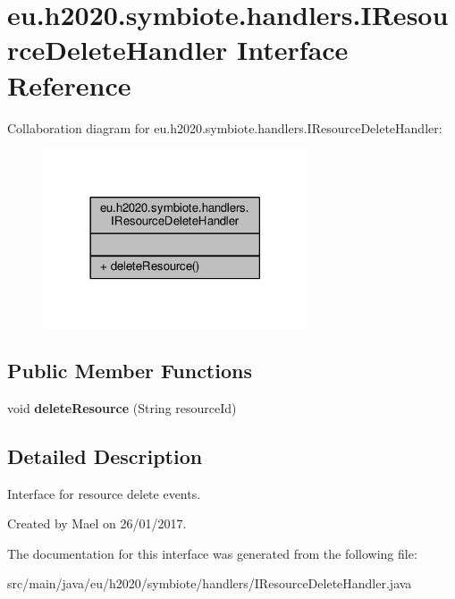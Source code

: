 \hypertarget{interfaceeu_1_1h2020_1_1symbiote_1_1handlers_1_1IResourceDeleteHandler}{}\section{eu.\+h2020.\+symbiote.\+handlers.\+I\+Resource\+Delete\+Handler Interface Reference}
\label{interfaceeu_1_1h2020_1_1symbiote_1_1handlers_1_1IResourceDeleteHandler}


Collaboration diagram for eu.\+h2020.\+symbiote.\+handlers.\+I\+Resource\+Delete\+Handler\+:
\nopagebreak
\begin{figure}[H]
\begin{center}
\leavevmode
\includegraphics[width=222pt]{interfaceeu_1_1h2020_1_1symbiote_1_1handlers_1_1IResourceDeleteHandler__coll__graph}
\end{center}
\end{figure}
\subsection*{Public Member Functions}
\begin{DoxyCompactItemize}
\item 
void {\bfseries delete\+Resource} (String resource\+Id)\hypertarget{interfaceeu_1_1h2020_1_1symbiote_1_1handlers_1_1IResourceDeleteHandler_a920d821c974799948a8c8afa070a1f73}{}\label{interfaceeu_1_1h2020_1_1symbiote_1_1handlers_1_1IResourceDeleteHandler_a920d821c974799948a8c8afa070a1f73}

\end{DoxyCompactItemize}


\subsection{Detailed Description}
Interface for resource delete events.

Created by Mael on 26/01/2017. 

The documentation for this interface was generated from the following file\+:\begin{DoxyCompactItemize}
\item 
src/main/java/eu/h2020/symbiote/handlers/I\+Resource\+Delete\+Handler.\+java\end{DoxyCompactItemize}
